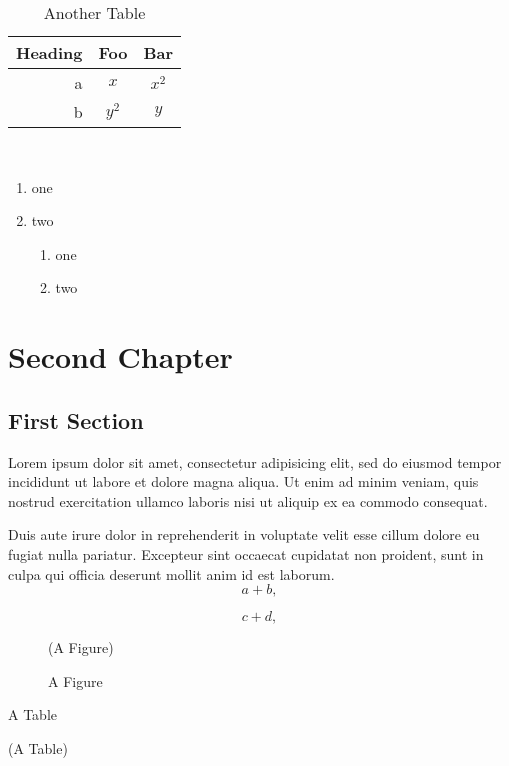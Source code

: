 \documentclass{report}
\begin{document}
\begin{table}
\begin{centering}
\caption{Another Table}
\begin{tabular}{r|cc}
Heading & Foo & Bar\\\hline
a & $x$ & $x^2$\\
b & $y^2$ & $y$\\
\end{tabular}\\
\end{centering}
\end{table}

\begin{enumerate}
 \item one
 \item two
   \begin{enumerate}
    \item one
    \item two
   \end{enumerate}
\end{enumerate}


\chapter{Second Chapter}
\section{First Section}
Lorem ipsum dolor sit amet, consectetur adipisicing elit, sed do eiusmod tempor incididunt ut labore et dolore magna aliqua. Ut enim ad minim veniam, quis nostrud exercitation ullamco laboris nisi ut aliquip ex ea commodo consequat.

Duis aute irure dolor in reprehenderit in voluptate velit esse cillum dolore eu fugiat nulla pariatur. Excepteur sint occaecat cupidatat non proident, sunt in culpa qui officia deserunt mollit anim id est laborum.
\begin{equation}
 a + b,
\end{equation}

\begin{equation}
 c + d,
\end{equation}

\begin{figure}
(A Figure)
\caption{A Figure}
\end{figure}

\begin{table}
\caption{A Table}
(A Table)
\end{table}
\end{document}

